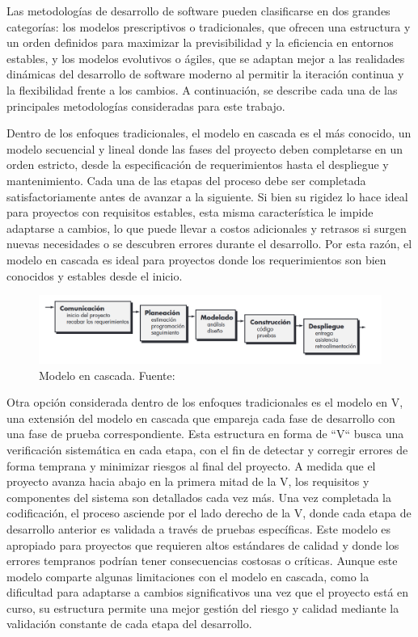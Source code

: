 Las metodologías de desarrollo de software pueden clasificarse en dos grandes categorías: los modelos prescriptivos o tradicionales, que ofrecen una estructura y un orden definidos para maximizar la previsibilidad y la eficiencia en entornos estables, y los modelos evolutivos o ágiles, que se adaptan mejor a las realidades dinámicas del desarrollo de software moderno al permitir la iteración continua y la flexibilidad frente a los cambios. A continuación, se describe cada una de las principales metodologías consideradas para este trabajo.

Dentro de los enfoques tradicionales, el modelo en cascada es el más conocido, un modelo secuencial y lineal donde las fases del proyecto deben completarse en un orden estricto, desde la especificación de requerimientos hasta el despliegue y mantenimiento. Cada una de las etapas del proceso debe ser completada satisfactoriamente antes de avanzar a la siguiente. Si bien su rigidez lo hace ideal para proyectos con requisitos estables, esta misma característica le impide adaptarse a cambios, lo que puede llevar a costos adicionales y retrasos si surgen nuevas necesidades o se descubren errores durante el desarrollo. Por esta razón, el modelo en cascada es ideal para proyectos donde los requerimientos son bien conocidos y estables desde el inicio.

\begin{figure}[h]
    \centering
    \includegraphics[width=\linewidth]{Figures/model-waterfall.png}
    \caption{Modelo en cascada. Fuente: \cite{pressman2010ingenieria}}
\end{figure}

Otra opción considerada dentro de los enfoques tradicionales es el modelo en V, una extensión del modelo en cascada que empareja cada fase de desarrollo con una fase de prueba correspondiente. Esta estructura en forma de ``V`` busca una verificación sistemática en cada etapa, con el fin de detectar y corregir errores de forma temprana y minimizar riesgos al final del proyecto. A medida que el proyecto avanza hacia abajo en la primera mitad de la V, los requisitos y componentes del sistema son detallados cada vez más. Una vez completada la codificación, el proceso asciende por el lado derecho de la V, donde cada etapa de desarrollo anterior es validada a través de pruebas específicas. Este modelo es apropiado para proyectos que requieren altos estándares de calidad y donde los errores tempranos podrían tener consecuencias costosas o críticas. Aunque este modelo comparte algunas limitaciones con el modelo en cascada, como la dificultad para adaptarse a cambios significativos una vez que el proyecto está en curso, su estructura permite una mejor gestión del riesgo y calidad mediante la validación constante de cada etapa del desarrollo.


